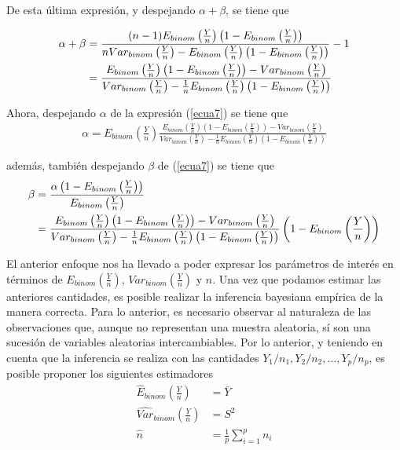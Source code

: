 De esta última expresión, y despejando $\alpha +\beta$, se tiene que

\begin{align}
\alpha+\beta&=\frac{(n-1)E_{binom}\left(\frac{Y}{n}\right)\left(1-E_{binom}\left(\frac{Y}{n}\right)\right)}
{nVar_{binom}\left(\frac{Y}{n}\right)-
E_{binom}\left(\frac{Y}{n}\right)\left(1-E_{binom}\left(\frac{Y}{n}\right)\right)}-1\notag \\
&=\frac{E_{binom}\left(\frac{Y}{n}\right)\left(1-E_{binom}\left(\frac{Y}{n}\right)\right)-Var_{binom}\left(\frac{Y}{n}\right)}
{Var_{binom}\left(\frac{Y}{n}\right)-\frac{1}{n}E_{binom}\left(\frac{Y}{n}\right)\left(1-E_{binom}\left(\frac{Y}{n}\right)\right)}
\end{align}

Ahora, despejando $\alpha$ de la expresión (\ref{ecua7}) se tiene que
\begin{align}
\alpha=E_{binom}\left(\frac{Y}{n}\right)\frac{E_{binom}\left(\frac{Y}{n}\right)\left(1-E_{binom}\left(\frac{Y}{n}\right)\right)
-Var_{binom}\left(\frac{Y}{n}\right)}{Var_{binom}\left(\frac{Y}{n}\right)
-\frac{1}{n}E_{binom}\left(\frac{Y}{n}\right)\left(1-E_{binom}\left(\frac{Y}{n}\right)\right)}
\end{align}

además, también despejando $\beta$ de (\ref{ecua7}) se tiene que
\begin{align}
\beta&=\frac{\alpha\left(1-E_{binom}\left(\frac{Y}{n}\right)\right)}{E_{binom}\left(\frac{Y}{n}\right)} \notag \\
&=\frac{E_{binom}\left(\frac{Y}{n}\right)\left(1-E_{binom}\left(\frac{Y}{n}\right)\right)-Var_{binom}\left(\frac{Y}{n}\right)}
{Var_{binom}\left(\frac{Y}{n}\right)-\frac{1}{n}E_{binom}\left(\frac{Y}{n}\right)\left(1-E_{binom}\left(\frac{Y}{n}\right)\right)}\left(1-E_{binom}\left(\frac{Y}{n}\right)\right)
\end{align}

El anterior enfoque nos ha llevado a poder expresar los parámetros de interés en términos de $E_{binom}\left(\frac{Y}{n}\right)$, $Var_{binom}\left(\frac{Y}{n}\right)$ y $n$. Una vez que podamos estimar las anteriores cantidades, es posible realizar la inferencia bayesiana empírica de la manera correcta. Para lo anterior, es necesario observar al naturaleza de las observaciones que, aunque no representan una muestra aleatoria, sí son una sucesión de variables aleatorias intercambiables. Por lo anterior, y teniendo en cuenta que la inferencia se realiza con las cantidades $Y_1/n_1, Y_2/n_2, \ldots, Y_p/n_p$, es posible proponer los siguientes estimadores
\begin{align}
\hat{E}_{binom}\left(\frac{Y}{n}\right)&=\bar{Y} \\
\hat{Var}_{binom}\left(\frac{Y}{n}\right)&=S^2 \\
\hat{n}&=\frac{1}{p}\sum_{i=1}^pn_i
\end{align}

